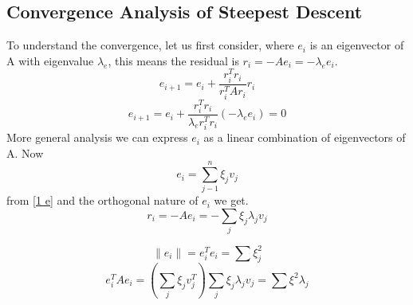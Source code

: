 \subsection{Convergence Analysis of Steepest Descent}
To understand the convergence, let us first consider, where $e_i$ is an eigenvector of A
with eigenvalue $\lambda_e$, this means the residual is $r_i=-Ae_i=-\lambda_e e_i$.
\[e_{i+1} = e_{i} +\frac{r_i^Tr_i}{r_i^TAr_i}r_i \]
\[e_{i+1} = e_{i} +\frac{r_i^Tr_i}{\lambda_er_i^Tr_i}(-\lambda_e e_i)=0 \]
More general analysis we can express $e_i$ as a linear combination of eigenvectors of A.
Now
\begin{equation}
\label{1 e}
e_i = \sum_{j-1}^{n} \xi_jv_j
\end{equation}
from \ref{1 e} and the orthogonal nature of $e_i$ we get.
\begin{equation}
\label{2 e}
r_i = -Ae_i = - \sum_{j} \xi_j \lambda_j v_j
\end{equation}

\begin{equation}
\lVert e_i\rVert  = e_i^Te_i = \sum \xi_j^2
\end{equation}
\begin{equation}
e^T_iAe_i =( \sum_j \xi_j v_j^T) \sum_j \xi_j \lambda_j v_j = \sum \xi^2 \lambda_j 
\end{equation}

